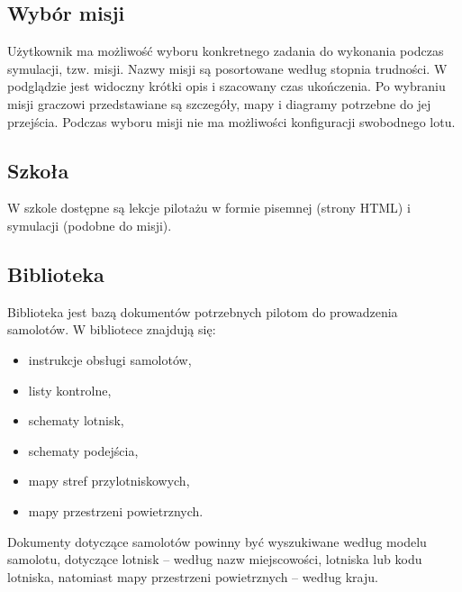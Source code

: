 \documentclass{mwrep}
\begin{document}
\subsection{Wybór misji}

Użytkownik ma możliwość wyboru konkretnego zadania do wykonania podczas symulacji, tzw. misji. Nazwy misji są posortowane według stopnia trudności. W podglądzie jest widoczny krótki opis i szacowany czas ukończenia. Po wybraniu misji graczowi przedstawiane są szczegóły, mapy i diagramy potrzebne do jej przejścia. Podczas wyboru misji nie ma możliwości konfiguracji swobodnego lotu.

\subsection{Szkoła}
W szkole dostępne są lekcje pilotażu w formie pisemnej (strony HTML) i symulacji (podobne do misji).

\subsection{Biblioteka}
Biblioteka jest bazą dokumentów potrzebnych pilotom do prowadzenia samolotów. W bibliotece znajdują się:
\begin{itemize}
\item instrukcje obsługi samolotów,
\item listy kontrolne,
\item schematy lotnisk,
\item schematy podejścia,
\item mapy stref przylotniskowych,
\item mapy przestrzeni powietrznych.
\end{itemize}

Dokumenty dotyczące samolotów powinny być wyszukiwane według modelu samolotu, dotyczące lotnisk -- według nazw miejscowości, lotniska lub kodu lotniska, natomiast mapy przestrzeni powietrznych -- według kraju.
\end{document}
